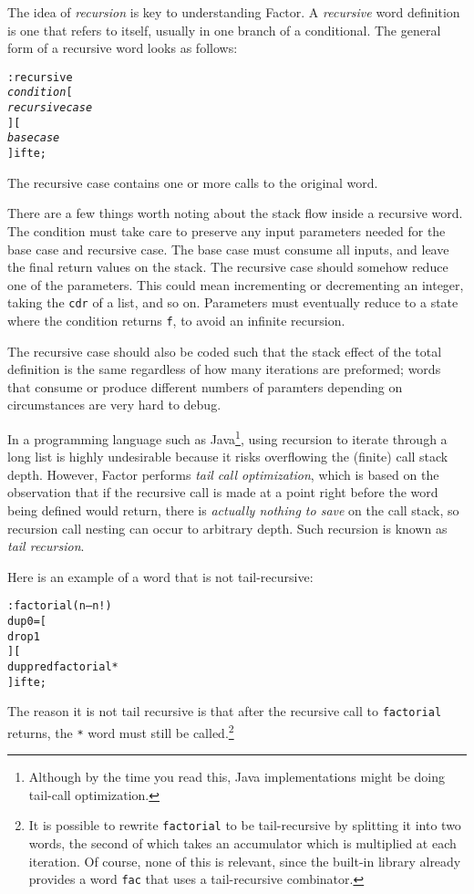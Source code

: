 \documentclass[english]{article}
\begin{document}
{The idea of \emph{recursion} is key to understanding Factor. A \emph{recursive} word definition is one that refers to itself, usually in one branch of a conditional. The general form of a recursive word looks as follows:

\begin{alltt}
: recursive
    \emph{condition} {[}
        \emph{recursive case}
    {] [}
        \emph{base case}
    {]} ifte ;
\end{alltt}

The recursive case contains one or more calls to the original word.

There are a few things worth noting about the stack flow inside a recursive word. The condition must take care to preserve any input parameters needed for the base case and recursive case. The base case must consume all inputs, and leave the final return values on the stack. The recursive case should somehow reduce one of the parameters. This could mean incrementing or decrementing an integer, taking the \texttt{cdr} of a list, and so on. Parameters must eventually reduce to a state where the condition returns \texttt{f}, to avoid an infinite recursion.

The recursive case should also be coded such that the stack effect of the total definition is the same regardless of how many iterations are preformed; words that consume or produce different numbers of paramters depending on circumstances are very hard to debug.

In a programming language such as Java\footnote{Although by the time you read this, Java implementations might be doing tail-call optimization.}, using recursion to iterate through a long list is highly undesirable because it risks overflowing the (finite) call stack depth. However, Factor performs \emph{tail call optimization}, which is based on the observation that if the recursive call is made at a point right before the word being defined would return, there is \emph{actually nothing to save} on the call stack, so recursion call nesting can occur to arbitrary depth. Such recursion is known as \emph{tail recursion}.

Here is an example of a word that is not tail-recursive:

\begin{alltt}
: factorial ( n -- n! )
    dup 0 = {[}
        drop 1
    {] [}
        dup pred factorial *
    {]} ifte ;
\end{alltt}

The reason it is not tail recursive is that after the recursive call to \texttt{factorial} returns, the \texttt{*} word must still be called.\footnote{
It is possible to rewrite \texttt{factorial} to be tail-recursive by splitting it into two words, the second of which takes an accumulator which is multiplied at each iteration. Of course, none of this is relevant, since the built-in library already provides a word \texttt{fac} that uses a tail-recursive combinator.}

}
\end{document}
